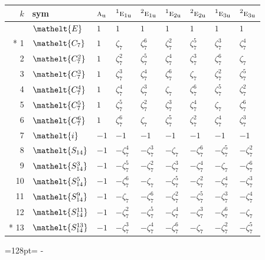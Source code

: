 \documentclass[10pt,a4paper]{article}
\newcommand{\needspace}[1]{\par\penalty-100\begingroup\dimen0=#1\relax\dimen2=\pagegoal
  \advance\dimen2-\pagetotal\ifdim\dimen0>\dimen2\relax\ifdim\dimen2>0pt\vfil\break\fi\fi
  \endgroup}
\numberwithin{equation}{section}
\newcommand{\eltfont}[1]{{\let\sigma\eltsigma\mathelt{#1}}}
\newcommand{\irr}[1]{\text{\normalfont\scshape #1}}
\newcommand{\conjpair}[1]{{}^{#1}}
\newcommand{\cls}[1]{\eltfont{#1}}
\newcommand{\ptag}[1]{\mathrm{#1}}
\newcommand{\rootunity}[1]{\zeta_{#1}}
\begin{document}
{\small\setlength{\tabcolsep}{4pt}
\begin{longtable}{@{}rllllllll@{}}\toprule
$k$ & sym & $\irr{a}_{\ptag{u}}$ & $\conjpair{1}\irr{e}_{1\ptag{u}}$ & $\conjpair{2}\irr{e}_{1\ptag{u}}$ & $\conjpair{1}\irr{e}_{2\ptag{u}}$ & $\conjpair{2}\irr{e}_{2\ptag{u}}$ & $\conjpair{1}\irr{e}_{3\ptag{u}}$ & $\conjpair{2}\irr{e}_{3\ptag{u}}$\\\midrule\endhead
\bottomrule\endfoot\endlastfoot
0 & $\cls{E}$ & $1$ & $1$ & $1$ & $1$ & $1$ & $1$ & $1$\\*
1 & $\cls{C_{7}}$ & $1$ & $\rootunity{7}$ & $\rootunity{7}^{6}$ & $\rootunity{7}^{2}$ & $\rootunity{7}^{5}$ & $\rootunity{7}^{3}$ & $\rootunity{7}^{4}$\\
2 & $\cls{C_{7}^{2}}$ & $1$ & $\rootunity{7}^{2}$ & $\rootunity{7}^{5}$ & $\rootunity{7}^{4}$ & $\rootunity{7}^{3}$ & $\rootunity{7}^{6}$ & $\rootunity{7}$\\
3 & $\cls{C_{7}^{3}}$ & $1$ & $\rootunity{7}^{3}$ & $\rootunity{7}^{4}$ & $\rootunity{7}^{6}$ & $\rootunity{7}$ & $\rootunity{7}^{2}$ & $\rootunity{7}^{5}$\\
4 & $\cls{C_{7}^{4}}$ & $1$ & $\rootunity{7}^{4}$ & $\rootunity{7}^{3}$ & $\rootunity{7}$ & $\rootunity{7}^{6}$ & $\rootunity{7}^{5}$ & $\rootunity{7}^{2}$\\
5 & $\cls{C_{7}^{5}}$ & $1$ & $\rootunity{7}^{5}$ & $\rootunity{7}^{2}$ & $\rootunity{7}^{3}$ & $\rootunity{7}^{4}$ & $\rootunity{7}$ & $\rootunity{7}^{6}$\\
6 & $\cls{C_{7}^{6}}$ & $1$ & $\rootunity{7}^{6}$ & $\rootunity{7}$ & $\rootunity{7}^{5}$ & $\rootunity{7}^{2}$ & $\rootunity{7}^{4}$ & $\rootunity{7}^{3}$\\
7 & $\cls{i}$ & $-1$ & $-1$ & $-1$ & $-1$ & $-1$ & $-1$ & $-1$\\
8 & $\cls{S_{14}}$ & $-1$ & $-\rootunity{7}^{4}$ & $-\rootunity{7}^{3}$ & $-\rootunity{7}$ & $-\rootunity{7}^{6}$ & $-\rootunity{7}^{5}$ & $-\rootunity{7}^{2}$\\
9 & $\cls{S_{14}^{3}}$ & $-1$ & $-\rootunity{7}^{5}$ & $-\rootunity{7}^{2}$ & $-\rootunity{7}^{3}$ & $-\rootunity{7}^{4}$ & $-\rootunity{7}$ & $-\rootunity{7}^{6}$\\
10 & $\cls{S_{14}^{5}}$ & $-1$ & $-\rootunity{7}^{6}$ & $-\rootunity{7}$ & $-\rootunity{7}^{5}$ & $-\rootunity{7}^{2}$ & $-\rootunity{7}^{4}$ & $-\rootunity{7}^{3}$\\
11 & $\cls{S_{14}^{9}}$ & $-1$ & $-\rootunity{7}$ & $-\rootunity{7}^{6}$ & $-\rootunity{7}^{2}$ & $-\rootunity{7}^{5}$ & $-\rootunity{7}^{3}$ & $-\rootunity{7}^{4}$\\
12 & $\cls{S_{14}^{11}}$ & $-1$ & $-\rootunity{7}^{2}$ & $-\rootunity{7}^{5}$ & $-\rootunity{7}^{4}$ & $-\rootunity{7}^{3}$ & $-\rootunity{7}^{6}$ & $-\rootunity{7}$\\*
13 & $\cls{S_{14}^{13}}$ & $-1$ & $-\rootunity{7}^{3}$ & $-\rootunity{7}^{4}$ & $-\rootunity{7}^{6}$ & $-\rootunity{7}$ & $-\rootunity{7}^{2}$ & $-\rootunity{7}^{5}$\\
\bottomrule\end{longtable}}
\needspace{128pt}
\end{document}
